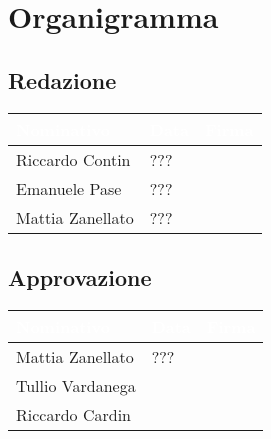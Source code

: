 \chapter{Organigramma}
\renewcommand\arraystretch{2,3}

\section{Redazione}

\begin{center}
  \centering
  \begin{longtable}{|C{3,5cm}|C{2cm}|C{6,5cm}|}
    \hline
    \textcolor[HTML]{FFFFFF}{\textbf{Nominativo}} & \textcolor[HTML]{FFFFFF}{\textbf{Data}} & \textcolor[HTML]{FFFFFF}{\textbf{Firma}} \\ \hline
    Riccardo Contin & ??? &  \\ \hline
    Emanuele Pase & ??? &  \\ \hline
    Mattia Zanellato & ??? &  \\ \hline
  \end{longtable}
\end{center}

\section{Approvazione}

\begin{center}
  \centering
  \begin{longtable}{|C{3,5cm}|C{2cm}|C{6,5cm}|}
    \hline
    \textcolor[HTML]{FFFFFF}{\textbf{Nominativo}} & \textcolor[HTML]{FFFFFF}{\textbf{Data}} & \textcolor[HTML]{FFFFFF}{\textbf{Firma}} \\ \hline
    Mattia Zanellato & ??? &  \\ \hline
    Tullio Vardanega &  &  \\ \hline
    Riccardo Cardin &  &  \\ \hline
  \end{longtable}
\end{center}

